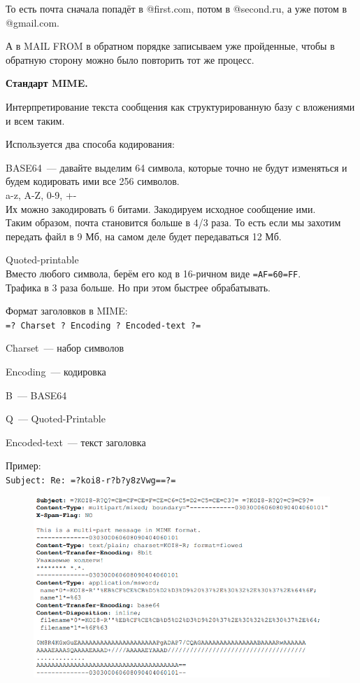То есть почта сначала попадёт в @first.com, потом в @second.ru, а уже потом в @gmail.com.

А в MAIL FROM в обратном порядке записываем уже пройденные, чтобы в обратную сторону можно было повторить тот же процесс.

{\bf Стандарт MIME.}

Интерпретирование текста сообщения как структурированную базу с вложениями и всем таким.

Используется два способа кодирования:
\begin{MyItemize}
    \item BASE64~--- давайте выделим 64 символа, которые точно не будут изменяться и будем кодировать ими все 256 символов.\\
    a-z, A-Z, 0-9, +-\\
    Их можно закодировать 6 битами. Закодируем исходное сообщение ими.\\
    Таким образом, почта становится больше в 4/3 раза. То есть если мы захотим передать файл в 9 Мб, на самом деле будет передаваться 12 Мб.
    \item Quoted-printable\\
    Вместо любого символа, берём его код в 16-ричном виде {\tt =AF=60=FF}.\\
    Трафика в 3 раза больше. Но при этом быстрее обрабатывать.
\end{MyItemize}

Формат заголовков в MIME:\\
{\tt =? Charset ? Encoding ? Encoded-text ?=}
\begin{MyItemize}
    \item Charset~--- набор символов
    \item Encoding~--- кодировка
    \begin{MyItemize}
        \item B~--- BASE64
        \item Q~--- Quoted-Printable
        \item Encoded-text~--- текст заголовка
    \end{MyItemize}
\end{MyItemize}

Пример:\\
{\tt Subject: Re: =?koi8-r?b?y8zVwg==?=}

\begin{figure}[H]
  \centering
  \includegraphics[width=15cm]{images/07/01}
\end{figure}

